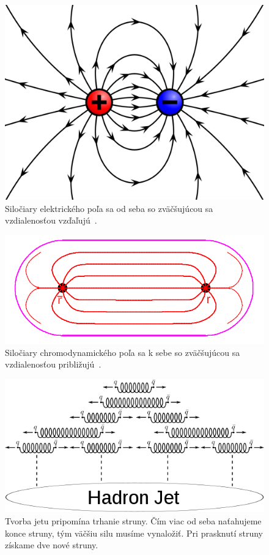 \documentclass[thesismargins, thesislinespacing]{rnthesis}
\begin{document}
\begin{figure}[hbtp!]
	\centering
	\includegraphics[scale=0.08]{./Obrazky_praca/el_pole.png}
	\caption{Siločiary elektrického poľa sa od seba so zväčšujúcou sa vzdialenosťou vzďaľujú~\cite{6}.}
	\label{elpole}
\end{figure}
\begin{figure}[hbtp!]
	\centering
	\includegraphics[scale=0.25]{./Obrazky_praca/chromo_pole.png}
	\caption {Siločiary chromodynamického poľa sa k sebe so zväčšujúcou sa vzdialenosťou približujú~\cite{7}.}
	\label{chrompole}
\end{figure}

\begin{figure}[hbtp!]
	\begin{center}
	\includegraphics[scale=0.5]{./Obrazky_praca/jet.png}
	\caption{Tvorba jetu pripomína trhanie struny. Čím viac od seba naťahujeme konce struny, tým väčšiu silu musíme vynaložiť. Pri prasknutí struny získame dve nové struny.~\cite{8}}
	\label{jet}
	\end{center}
\end{figure}  
\end{document}
